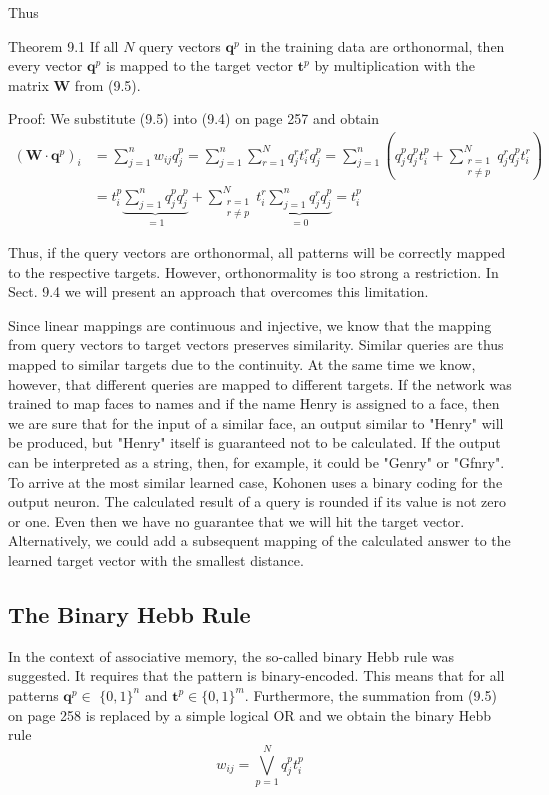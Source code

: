\documentclass[10pt]{book}
\begin{document}
Thus

Theorem 9.1 If all $N$ query vectors $\boldsymbol{q}^{p}$ in the training data are orthonormal, then every vector $\boldsymbol{q}^{p}$ is mapped to the target vector $\boldsymbol{t}^{p}$ by multiplication with the matrix $\boldsymbol{W}$ from (9.5).

Proof: We substitute (9.5) into (9.4) on page 257 and obtain
$$
\begin{aligned}
\left(\boldsymbol{W} \cdot \boldsymbol{q}^{p}\right)_{i} & =\sum_{j=1}^{n} w_{i j} q_{j}^{p}=\sum_{j=1}^{n} \sum_{r=1}^{N} q_{j}^{r} t_{i}^{r} q_{j}^{p}=\sum_{j=1}^{n}\left(q_{j}^{p} q_{j}^{p} t_{i}^{p}+\sum_{\substack{r=1 \\
r \neq p}}^{N} q_{j}^{r} q_{j}^{p} t_{i}^{r}\right) \\
& =t_{i}^{p} \underbrace{\sum_{j=1}^{n} q_{j}^{p} q_{j}^{p}}_{=1}+\sum_{\substack{r=1 \\
r \neq p}}^{N} t_{i}^{r} \underbrace{\sum_{j=1}^{n} q_{j}^{r} q_{j}^{p}}_{=0}=t_{i}^{p}
\end{aligned}
$$

Thus, if the query vectors are orthonormal, all patterns will be correctly mapped to the respective targets. However, orthonormality is too strong a restriction. In Sect. 9.4 we will present an approach that overcomes this limitation.

Since linear mappings are continuous and injective, we know that the mapping from query vectors to target vectors preserves similarity. Similar queries are thus mapped to similar targets due to the continuity. At the same time we know, however, that different queries are mapped to different targets. If the network was trained to map faces to names and if the name Henry is assigned to a face, then we are sure that for the input of a similar face, an output similar to "Henry" will be produced, but "Henry" itself is guaranteed not to be calculated. If the output can be interpreted as a string, then, for example, it could be "Genry" or "Gfnry". To arrive at the most similar learned case, Kohonen uses a binary coding for the output neuron. The calculated result of a query is rounded if its value is not zero or one. Even then we have no guarantee that we will hit the target vector. Alternatively, we could add a subsequent mapping of the calculated answer to the learned target vector with the smallest distance.

\subsection{The Binary Hebb Rule}
In the context of associative memory, the so-called binary Hebb rule was suggested. It requires that the pattern is binary-encoded. This means that for all patterns $\boldsymbol{q}^{p} \in$ $\{0,1\}^{n}$ and $\boldsymbol{t}^{p} \in\{0,1\}^{m}$. Furthermore, the summation from (9.5) on page 258 is replaced by a simple logical OR and we obtain the binary Hebb rule
\begin{equation*}
w_{i j}=\bigvee_{p=1}^{N} q_{j}^{p} t_{i}^{p} \tag{9.10}
\end{equation*}
\end{document}
